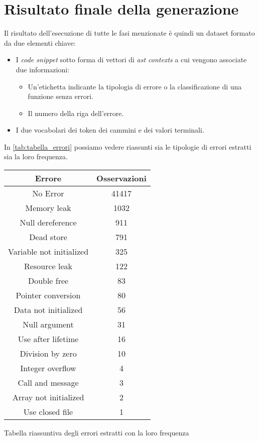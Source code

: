 \section{Risultato finale della generazione}
Il risultato dell'esecuzione di tutte le fasi menzionate è quindi un dataset formato da due elementi chiave:
    \begin{itemize}
        \item I \textit{code snippet} sotto forma di vettori di \textit{ast contexts} a cui vengono associate due informazioni:
        \begin{itemize}
            \item Un'etichetta indicante la tipologia di errore o la classificazione di una funzione senza errori.
            \item Il numero della riga dell'errore.
        \end{itemize}
        \item I due vocabolari dei token dei cammini e dei valori terminali.
    \end{itemize}
In \autoref{tab:tabella_errori} possiamo vedere riassunti sia le tipologie di errori estratti sia la loro frequenza.
    \begin{center}
      \begin{tabular}{|c|c|}
        \hline
        Errore & Osservazioni \\
        \hline
        No Error & 41417 \\
        \hline
        Memory leak & 1032 \\
        \hline
        Null dereference & 911 \\
        \hline
        Dead store & 791 \\
        \hline
        Variable not initialized & 325 \\
        \hline
        Resource leak & 122 \\
        \hline
        Double free & 83 \\
        \hline
        Pointer conversion & 80 \\
        \hline
        Data not initialized & 56 \\
        \hline
        Null argument & 31 \\
        \hline
        Use after lifetime & 16 \\
        \hline
        Division by zero & 10 \\
        \hline
        Integer overflow & 4 \\
        \hline
        Call and message & 3 \\
        \hline
        Array not initialized & 2 \\
        \hline
        Use closed file & 1 \\
        \hline
      \end{tabular}
      \caption{Tabella riassuntiva degli errori estratti con la loro frequenza}
      \label{tab:tabella_errori}
    \end{center}


